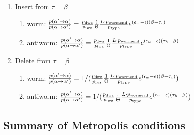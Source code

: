 \documentclass[12pt, two sided]{article}
\begin{document}
\begin{enumerate}
		\item Insert from $\tau=\beta$
		\begin{enumerate}
		\item{worm: $\frac{p(\alpha^\prime\to\alpha)}{p(\alpha\to\alpha^\prime)} = \frac{p_{\rm{dwz}}}{p_{\rm{iwz}}} \frac{1}{\Theta} \frac{L \cdot p_{\rm{wormend}}}{p_{\rm{type}}} e^{(\epsilon_w-\epsilon)(\beta-\tau_t)}$}
		\item{antiworm: $\frac{p(\alpha^\prime\to\alpha)}{p(\alpha\to\alpha^\prime)} = \frac{p_{\rm{dwz}}}{p_{\rm{iwz}}} \frac{1}{\Theta}  \frac{L \cdot p_{\rm{wormend}}}{p_{\rm{type}}} e^{(\epsilon_w-\epsilon)(\tau_h-\beta)}$}
		\end{enumerate}
		
		\item Delete from $\tau=\beta$ 
		\begin{enumerate}
		\item{worm: $\frac{p(\alpha^\prime\to\alpha)}{p(\alpha\to\alpha^\prime)} = 1/(\frac{p_{\rm{dwz}}}{p_{\rm{iwz}}} \frac{1}{\Theta}  \frac{L \cdot p_{\rm{wormend}}}{p_{\rm{type}}} e^{(\epsilon_w-\epsilon)(\beta-\tau_t)})$}
		\item{antiworm: $\frac{p(\alpha^\prime\to\alpha)}{p(\alpha\to\alpha^\prime)} = 1/(\frac{p_{\rm{dwz}}}{p_{\rm{iwz}}} \frac{1}{\Theta}  \frac{L \cdot p_{\rm{wormend}}}{p_{\rm{type}}} e^{(\epsilon_w-\epsilon)(\tau_h-\beta)})$}
		\end{enumerate}
	\end{enumerate}
	
\subsection{Summary of Metropolis conditions}
	
\end{document}
